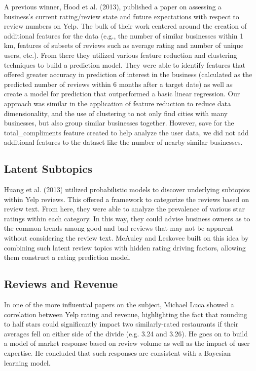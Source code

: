 \quad A previous winner, Hood et al. (2013), published a paper on assessing a business’s current rating/review state and future expectations with respect to review numbers on Yelp. The bulk of their work centered around the creation of additional features for the data (e.g., the number of similar businesses within 1 km, features of subsets of reviews such as average rating and number of unique users, etc.). From there they utilized various feature reduction and clustering techniques to build a prediction model. They were able to identify features that offered greater accuracy in prediction of interest in the business (calculated as the predicted number of reviews within 6 months after a target date) as well as create a model for prediction that outperformed a basic linear regression. Our approach was similar in the application of feature reduction to reduce data dimensionality, and the use of clustering to not only find cities with many businesses, but also group similar businesses together. However, save for the total_compliments feature created to help analyze the user data, we did not add additional features to the dataset like the number of nearby similar businesses.

\subsection{Latent Subtopics}

\quad Huang et al. (2013) utilized probabilistic models to discover underlying subtopics within Yelp reviews. This offered a framework to categorize the reviews based on review text. From here, they were able to analyze the prevalence of various star ratings within each category. In this way, they could advise business owners as to the common trends among good and bad reviews that may not be apparent without considering the review text. McAuley and Leskovec built on this idea by combining such latent review topics with hidden rating driving factors, allowing them construct a rating prediction model.

\subsection{Reviews and Revenue}

\quad In one of the more influential papers on the subject, Michael Luca showed a correlation between Yelp rating and revenue, highlighting the fact that rounding to half stars could significantly impact two similarly-rated restaurants if their averages fell on either side of the divide (e.g. 3.24 and 3.26). He goes on to build a model of market response based on review volume as well as the impact of user expertise. He concluded that such responses are consistent with a Bayesian learning model.


